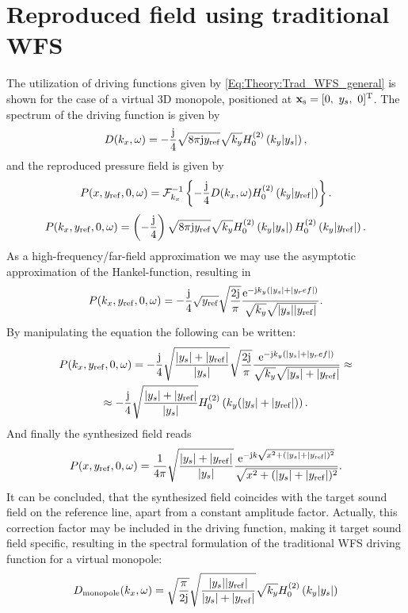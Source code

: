 \section{Reproduced field using traditional WFS}
\label{App: Trad_WFS_rep_field}

The utilization of driving functions given by \eqref{Eq:Theory:Trad_WFS_general} is shown for the case of a virtual 3D monopole, positioned at $\mathbf{x}_{\mathrm{s}} = [0,\ y_s,\ 0]^{\mathrm{T}}$.
The spectrum of the driving function is 
given by
\begin{equation}
D(k_x,\omega) = -\frac{\mathrm{j}}{4}\sqrt{8\pi\mathrm{j} y_{\mathrm{ref}}}\sqrt{k_y} H_0^{(2)} \left( k_y |y_s| \right),
\end{equation}
and the reproduced pressure field is given by
\begin{equation}
P(x,y_{\mathrm{ref}},0,\omega) = \mathcal{F}^{-1}_{k_x} \left\{ -\frac{\mathrm{j}}{4} D(k_x,\omega)  H_0^{(2)} \left( k_y |y_{\mathrm{ref}}| \right) \right\}.
\end{equation}
\begin{equation}
P(k_x,y_{\mathrm{ref}},0,\omega) = \left( -\frac{\mathrm{j}}{4} \right) 
\sqrt{8\pi\mathrm{j} y_{\mathrm{ref}}}\sqrt{k_y} H_0^{(2)} \left( k_y |y_s| \right)H_0^{(2)} \left( k_y |y_{\mathrm{ref}}| \right).
\end{equation}
As a high-frequency/far-field approximation we may use the asymptotic approximation of the Hankel-function, resulting in
\begin{equation}
P(k_x,y_{\mathrm{ref}},0,\omega) = -\frac{\mathrm{j}}{4}
\sqrt{y_{\mathrm{ref}}}\sqrt{\frac{2\mathrm{j} }{\pi}}\frac{\mathrm{e}^{-\mathrm{j} k_y \left( |y_s| + |y_ref| \right) }}{\sqrt{k_y} \sqrt{|y_s| | y_{\mathrm{ref}}|}}.
\end{equation}
By manipulating the equation the following can be written:
\begin{multline}
P(k_x,y_{\mathrm{ref}},0,\omega) = -\frac{\mathrm{j}}{4}
\sqrt{\frac{|y_s| + |y_{\mathrm{ref}}|}{|y_s|}}
\sqrt{\frac{2\mathrm{j} }{\pi}}\frac{\mathrm{e}^{-\mathrm{j} k_y \left( |y_s| + |y_ref| \right) }}{\sqrt{k_y} \sqrt{|y_s| + |y_{\mathrm{ref}}|}}
\approx \\
\approx
 -\frac{\mathrm{j}}{4}
\sqrt{\frac{|y_s| + |y_{\mathrm{ref}}|}{|y_s|}}
H_0^{(2)}\left( k_y (|y_s| + |y_{\mathrm{ref}}|) \right).
\end{multline}
And finally the synthesized field reads
\begin{equation}
P(x,y_{\mathrm{ref}},0,\omega) = 
\frac{1}{4\pi} 
\sqrt{\frac{|y_s| + |y_{\mathrm{ref}}|}{|y_s|}}
\frac{\mathrm{e}^{-\mathrm{j} k \sqrt{x^2 + (|y_s|+|y_{\mathrm{ref}}|)^2} }}{\sqrt{x^2 + (|y_s|+|y_{\mathrm{ref}}|)^2}}.
\end{equation}
It can be concluded, that the synthesized field coincides with the target sound field on the reference line, apart from a constant amplitude factor. Actually, this correction factor may be included in the driving function, making it target sound field specific, resulting in the spectral formulation of the traditional WFS driving function for a virtual monopole:
\begin{equation}
D_{\mathrm{monopole}}(k_x,\omega) = 
\sqrt{\frac{\pi}{2 \mathrm{j}}}
\sqrt{\frac{|y_s| |y_{\mathrm{ref}}|}{|y_s| + |y_{\mathrm{ref}}|}}
\sqrt{k_y} H_0^{(2)} \left( k_y |y_s| \right)
\end{equation}
